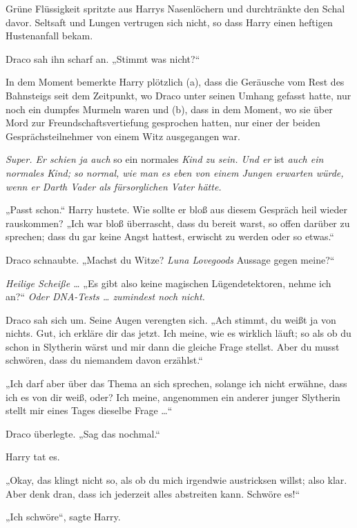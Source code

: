 {Grüne Flüssigkeit spritzte aus Harrys Nasenlöchern und durchtränkte den Schal davor. Seltsaft und Lungen vertrugen sich nicht, so dass Harry einen heftigen Hustenanfall bekam.

Draco sah ihn scharf an. „Stimmt was nicht?“

In dem Moment bemerkte Harry plötzlich (a), dass die Geräusche vom Rest des Bahnsteigs seit dem Zeitpunkt, wo Draco unter seinen Umhang gefasst hatte, nur noch ein dumpfes Murmeln waren und (b), dass in dem Moment, wo sie über Mord zur Freundschaftsvertiefung gesprochen hatten, nur einer der beiden Gesprächsteilnehmer von einem Witz ausgegangen war.

\emph{Super. Er schien ja auch} so ein normales \emph{Kind zu sein. Und er} ist \emph{auch ein normales Kind; so normal, wie man es eben von einem Jungen erwarten würde, wenn er Darth Vader als fürsorglichen Vater hätte.}

„Passt schon.“ Harry hustete. Wie sollte er bloß aus diesem Gespräch heil wieder rauskommen? „Ich war bloß überrascht, dass du bereit warst, so offen darüber zu sprechen; dass du gar keine Angst hattest, erwischt zu werden oder so etwas.“

Draco schnaubte. „Machst du Witze? \emph{Luna Lovegoods} Aussage gegen meine?“

\emph{Heilige Scheiße …} „Es gibt also keine magischen Lügendetektoren, nehme ich an?“ \emph{Oder DNA-Tests … zumindest noch nicht.}

Draco sah sich um. Seine Augen verengten sich. „Ach stimmt, du weißt ja von nichts. Gut, ich erkläre dir das jetzt. Ich meine, wie es wirklich läuft; so als ob du schon in Slytherin wärst und mir dann die gleiche Frage stellst. Aber du musst schwören, dass du niemandem davon erzählst.“

„Ich darf aber über das Thema an sich sprechen, solange ich nicht erwähne, dass ich es von dir weiß, oder? Ich meine, angenommen ein anderer junger Slytherin stellt mir eines Tages dieselbe Frage …“

Draco überlegte. „Sag das nochmal.“

Harry tat es.

„Okay, das klingt nicht so, als ob du mich irgendwie austricksen willst; also klar. Aber denk dran, dass ich jederzeit alles abstreiten kann. Schwöre es!“

„Ich schwöre“, sagte Harry.

}
